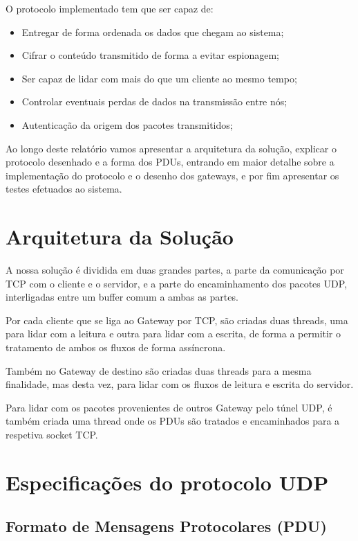 \documentclass[a4paper]{report}
\begin{document}
O protocolo implementado tem que ser capaz de: 

\begin{itemize}
        \item Entregar de forma ordenada os dados que chegam ao sistema;
        \item Cifrar o conteúdo transmitido de forma a evitar espionagem;
        \item Ser capaz de lidar com mais do que um cliente ao mesmo tempo;
        \item Controlar eventuais perdas de dados na transmissão entre nós;
        \item Autenticação da origem dos pacotes transmitidos;
\end{itemize}

Ao longo deste relatório vamos apresentar a arquitetura da solução, explicar
o protocolo desenhado e a forma dos PDUs, entrando em maior detalhe sobre a
implementação do protocolo e o desenho dos gateways, e por fim apresentar os
testes efetuados ao sistema.

\chapter{Arquitetura da Solução}

A nossa solução é dividida em duas grandes partes, a parte da comunicação
por TCP com o cliente e o servidor, e a parte do encaminhamento dos pacotes
UDP, interligadas entre um buffer comum a ambas as partes.

Por cada cliente que se liga ao Gateway por TCP, são criadas duas threads, 
uma para lidar com a leitura e outra para lidar com a escrita, de forma
a permitir o tratamento de ambos os fluxos de forma assíncrona.

Também no Gateway de destino são criadas duas threads para a mesma finalidade,
mas desta vez, para lidar com os fluxos de leitura e escrita do servidor.

Para lidar com os pacotes provenientes de outros Gateway pelo túnel UDP,
é também criada uma thread onde os PDUs são tratados e encaminhados para a
respetiva socket TCP.

\chapter{Especificações do protocolo UDP}
\section{Formato de Mensagens Protocolares (PDU)}
\end{document}
